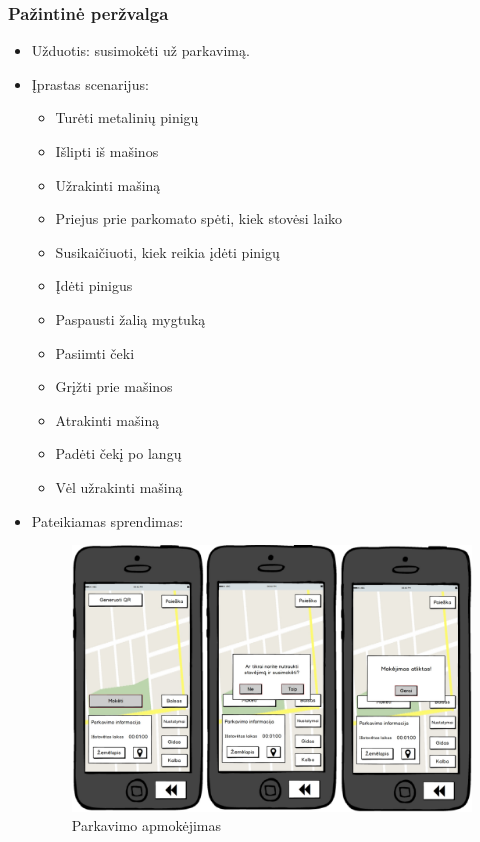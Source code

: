 \documentclass{VUMIFPSkursinis}
\begin{document}
\subsubsection{Pažintinė peržvalga}
\begin{itemize}
	\item Užduotis: susimokėti už parkavimą.

	\item Įprastas scenarijus:
		\begin{itemize}
			\item Turėti metalinių pinigų
			\item Išlipti iš mašinos
			\item Užrakinti mašiną
			\item Priejus prie parkomato spėti, kiek stovėsi laiko
			\item Susikaičiuoti, kiek reikia įdėti pinigų
			\item Įdėti pinigus 
			\item Paspausti žalią mygtuką
			\item Pasiimti čeki
			\item Grįžti prie mašinos
			\item Atrakinti mašiną
			\item Padėti čekį po langų
			\item Vėl užrakinti mašiną
		\end{itemize}
		
	\item Pateikiamas sprendimas:
	
		\begin{figure}[H]
			\centering
			\includegraphics[scale=0.5]{img/pav4}
			\caption{Parkavimo apmokėjimas \label{fig:pav4}}
		\end{figure}
	

\end{itemize}
\end{document}
